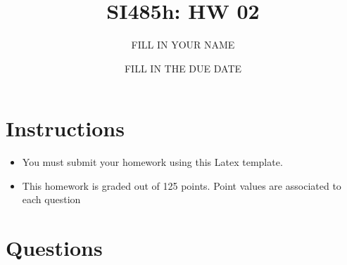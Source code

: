 \documentclass{article}[9pt]
\title{SI485h: HW 02}
\date{FILL IN THE DUE DATE}
\author{FILL IN YOUR NAME}
\begin{document}
\maketitle

\section*{Instructions}

\begin{itemize}
\item You must submit your homework using this Latex template.
  
\item This homework is graded out of 125 points. Point values are associated to each question
\end{itemize}

\section*{Questions}
\end{document}
